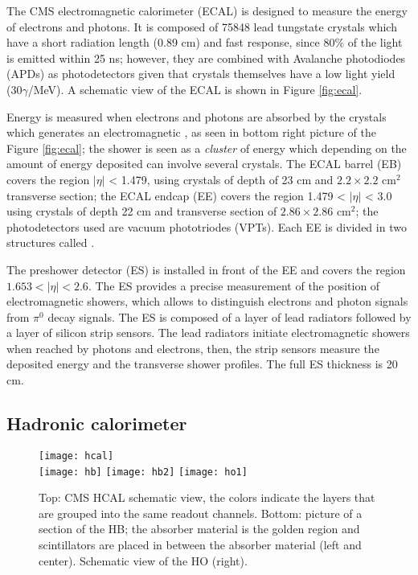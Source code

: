 The CMS electromagnetic calorimeter (ECAL) is designed to measure the energy of electrons and photons. It is composed of 75848 lead tungstate crystals which have a short radiation length (0.89 cm) and fast response, since 80\% of the light is emitted within 25 ns; however, they are combined with Avalanche photodiodes (APDs) as photodetectors given that crystals themselves have a low light yield (30$\gamma$/MeV). A schematic view of the ECAL is shown in Figure \ref{fig:ecal}.

Energy is measured when electrons and photons are absorbed by the crystals which generates an electromagnetic , as seen in bottom right picture of the Figure \ref{fig:ecal}; the shower is seen as a \textit{cluster} of energy which depending on the amount of energy deposited can involve several crystals. The ECAL barrel (EB) covers the region $|\eta|$ < 1.479, using crystals of depth of 23 cm and  $2.2\times 2.2$ cm$^2$ transverse section; the ECAL endcap (EE) covers the region 1.479 < $|\eta|$ < 3.0 using crystals of depth 22 cm and transverse section of $2.86\times2.86$ cm$^2$; the photodetectors used are vacuum phototriodes (VPTs). Each EE is divided in two structures called .

The preshower detector (ES) is installed in front of the EE and covers the region $1.653 < |\eta| < 2.6$. The ES provides a precise measurement of the position of electromagnetic showers, which allows to distinguish electrons and photon signals from $\pi^0$ decay signals. The ES is composed of a layer of lead radiators followed by a layer of silicon strip sensors. The lead radiators initiate electromagnetic showers when reached by photons and electrons, then, the strip sensors measure the deposited energy and the transverse shower profiles. The full ES thickness is 20 cm.

\subsection{Hadronic calorimeter}

\begin{figure}[h!]
  \centering
  \texttt{[image: hcal]}\\
  \texttt{[image: hb]}
  \texttt{[image: hb2]}
  \texttt{[image: ho1]} 
  \caption[CMS HCAL schematic view]{Top: CMS HCAL schematic view, the colors indicate the layers that are grouped into the same readout channels. Bottom: picture of a section of the HB; the absorber material is the golden region and scintillators are placed in between the absorber material (left and center). Schematic view of the HO (right). \cite{hcal,hb} }
  \label{fig:hcal}
\end{figure}

